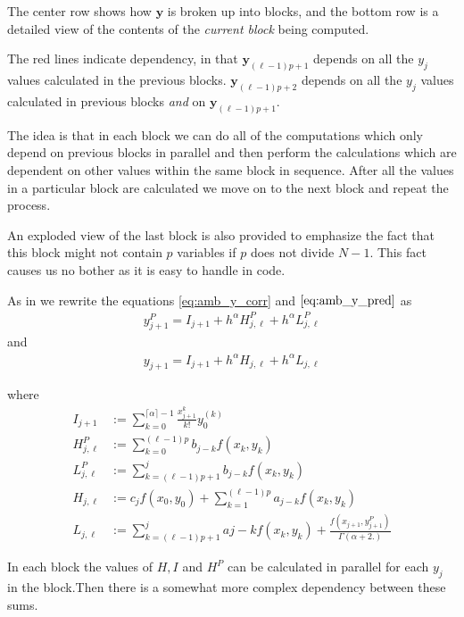The center row shows how $ \mathbf{y} $ is broken up into blocks, and the bottom row is a detailed view
of the contents of the \emph{current block} being computed.

The red lines indicate dependency, in that $ \mathbf{y}_{(\ell - 1)p + 1} $ depends on all the $ y_j $ values calculated in the previous blocks. $ \mathbf{y}_{(\ell - 1)p + 2} $ depends on all the $ y_j $ values calculated in previous blocks \emph{and} on $ \mathbf{y}_{(\ell - 1)p + 1 } $. 

The idea is that in each block we can do all of the computations which only depend on previous blocks in parallel and then perform the calculations which are dependent on other values within the same block in sequence. After all the values in a particular block are calculated we move on to the next block and repeat the process.

An exploded view of the last block is also provided to emphasize the fact that this block might not contain $ p $ variables if $ p $ does not divide $ N - 1 $. This fact causes us no bother as it is easy to handle in code.

As in \cite{Diethelm2011} we rewrite the equations \eqref{eq:amb_y_corr} and $ \eqref{eq:amb_y_pred} $ as
\begin{align}
y_{j+1}^P = I_{j+1} + h^\alpha H_{j,\ell}^P + h^\alpha L_{j,\ell}^P
\end{align}
and
\begin{align}
y_{j+1} = I_{j+1} + h^{\alpha} H_{j,\ell} + h^\alpha L_{j,\ell}
\end{align}

where
\begin{align}
I_{j+1} & := \sum_{k=0}^{\lceil \alpha \rceil -1} \frac{x_{j+1}^k}{k!} y_0^{(k)} \\
H^P_{j,\ell} & := \sum_{k=0}^{(\ell-1)p} b_{j-k} f(x_k, y_k) \\
L_{j,\ell}^P & := \sum_{k=(\ell-1)p+1}^{j} b_{j-k} f(x_k,y_k) \\
H_{j,\ell} & := c_j f(x_0, y_0) + \sum_{k=1}^{(\ell - 1)p} a_{j-k}f(x_k, y_k) \\
L_{j,\ell} & := \sum_{k=(\ell-1)p + 1}^j a{j-k} f(x_k, y_k) + \frac{f(x_{j+1}, y^P_{j+1})}{\Gamma(\alpha + 2.)}
\end{align}

In each block the values of $ H, I $ and $ H^P $ can be calculated in parallel for each $ y_j $ in the block.Then there is a somewhat more complex dependency between these sums. 

